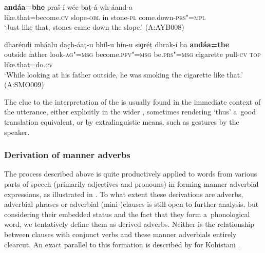 \begin{exe}
\ex
\label{ex:7-42}
\gll \textbf{andáa=bhe} praš-í wée baṭ-á wh-áand-a \\
like.that=become.\textsc{cv} slope-\textsc{obl} in stone-\textsc{pl} come.down-\textsc{prs"=mpl} \\
\glt `Just like that, stones came down the slope.' (A:AYB008)
\end{exe}
\begin{exe}
\ex
\label{ex:7-43}
\gll dharéndi mháalu dac̣h-áaṭ-u bhíl-u hín-u  siɡréṭ dhrak-í ba \textbf{andáa=the} \\
outside father look-\textsc{ag"=msg} become.\textsc{pfv"=msg} be.\textsc{prs"=msg} cigarette pull-\textsc{cv} \textsc{top} like.that=do.\textsc{cv}  \\
\glt `While looking at his father outside, he was smoking the cigarette like that.' (A:SMO009)
\end{exe}

The clue to the interpretation of the   is usually found in the immediate context of the utterance, either explicitly in the wider , sometimes rendering `thus' a~good translation equivalent, or by extralinguistic means, such as gestures by the speaker. 


\subsubsection*{Derivation of manner adverbs}

The  process described above is quite productively applied to words from various parts
of speech (primarily adjectives and pronouns) in forming manner adverbial expressions, as
illustrated in . To what extent these derivations are adverbs, adverbial phrases or
adverbial (mini-)clauses is still open to further analysis, but considering their embedded status
and the fact that they form a~phonological word, we tentatively define them as derived
adverbs. Neither is the relationship between  clauses with conjunct verbs and these manner
adverbials entirely clearcut. An exact parallel to this formation is described by
\citet[219]{schmidtkohistani2008} for Kohistani \iliShina.


